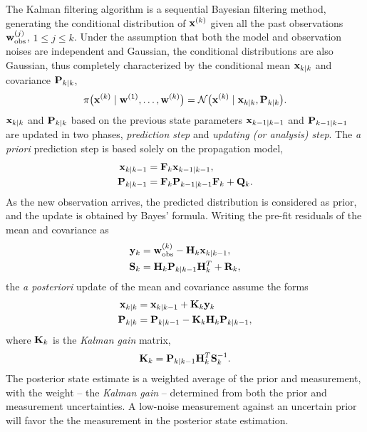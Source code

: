 \documentclass[fleqn,usenatbib]{mnras}
\begin{document}
    The Kalman filtering algorithm is a sequential Bayesian filtering method,
    generating the conditional distribution of $\mathbf{x}^{(k)}$ given all the
    past observations $\mathbf{w}^{(j)}_{\rm obs}$, $1\leq j\leq k$. Under the
    assumption that both the model and observation noises are independent and
    Gaussian, the conditional distributions are also Gaussian, thus completely
    characterized by the conditional mean $\mathbf{x}_{k\mid k}$ and covariance
    $\mathbf{P}_{k\mid k}$, 
    \begin{equation}
        \pi\big(\mathbf{x}^{(k)}\mid \mathbf{w}^{(1)},\ldots,\mathbf{w}^{(k)}\big)
        = \mathcal{N}\big( \mathbf{x}^{(k)}\mid \mathbf{x}_{k\mid k}, \mathbf{P}_{k\mid k}\big).
    \end{equation}
    $\mathbf{x}_{k\mid k}$  and $\mathbf{P}_{k\mid k}$ based on the previous state
    parameters $\mathbf{x}_{k-1\mid k-1}$ and $\mathbf{P}_{k-1\mid k-1}$ are updated
    in two phases, {\em prediction step} and {\em updating (or analysis) step}.
    The {\em a priori} prediction step is based solely on the propagation model,
    \begin{align}
        \mathbf{x}_{k\mid k-1} &= \mathbf{F}_k \mathbf{x}_{k-1\mid k-1},
        \\
        \mathbf{P}_{k\mid k-1} &= \mathbf{F}_k\mathbf{P}_{k-1\mid k-1} \mathbf{F}_k +{\mathbf Q}_k.
    \end{align} 
    As the new observation arrives, the predicted distribution is considered as
    prior, and the update is obtained by Bayes' formula. Writing the pre-fit
    residuals of the mean and covariance as
    \begin{align}
        \mathbf{y}_k &= \mathbf{w}^{(k)}_{\rm obs} - \mathbf{H}_k \mathbf{x}_{k\mid k-1},
        \\
        \mathbf{S}_k &= \mathbf{H}_k \mathbf{P}_{k\mid k-1} \mathbf{H}_k^T + \mathbf{R}_k,
    \end{align}
    the {\em a posteriori} update of the mean and covariance assume the forms
    \begin{align}
        \mathbf{x}_{k\mid k} &= \mathbf{x}_{k\mid k-1} + \mathbf{K}_k \mathbf{y}_k
        \\
        \mathbf{P}_{k\mid k} &= \mathbf{P}_{k\mid k-1} - \mathbf{K}_k \mathbf{H}_k\mathbf{P}_{k\mid k-1},
    \end{align}
    where $\mathbf{K}_k$ is the {\em Kalman gain} matrix, 
    \begin{equation}
        \mathbf{K}_k = \mathbf{P}_{k\mid k-1} \mathbf{H}_k^T \mathbf{S}_k^{-1}.
    \end{equation}
    The posterior state estimate is a weighted average of the prior and
    measurement, with the weight -- the {\em Kalman gain} -- determined from
    both the prior and measurement uncertainties. A low-noise measurement
    against an uncertain prior will favor the the measurement in the posterior
    state estimation.
\end{document}
